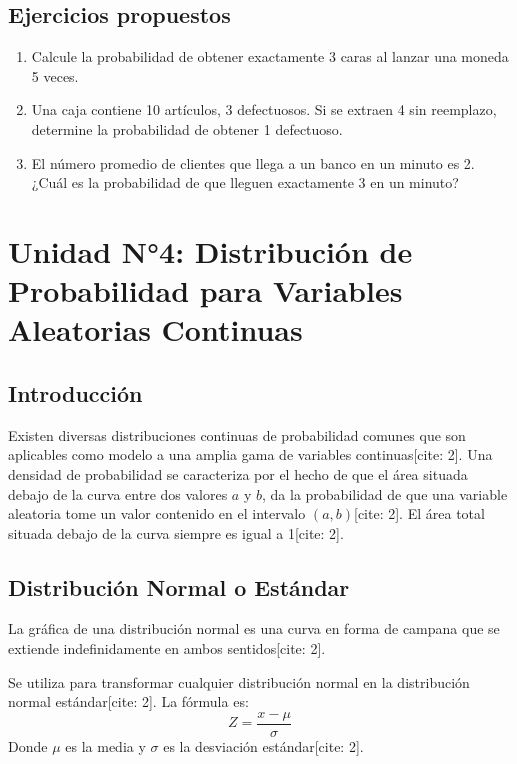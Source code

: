 \documentclass[12pt,a4paper]{book}
\begin{document}
\section{Ejercicios propuestos}
\begin{enumerate}
    \item Calcule la probabilidad de obtener exactamente 3 caras al lanzar una moneda 5 veces.
    \item Una caja contiene 10 artículos, 3 defectuosos. Si se extraen 4 sin reemplazo, determine la probabilidad de obtener 1 defectuoso.
    \item El número promedio de clientes que llega a un banco en un minuto es 2. ¿Cuál es la probabilidad de que lleguen exactamente 3 en un minuto?
\end{enumerate}


\chapter{Unidad N°4: Distribución de Probabilidad para Variables Aleatorias Continuas}

\section{Introducción}
Existen diversas distribuciones continuas de probabilidad comunes que son aplicables como modelo a una amplia gama de variables continuas[cite: 2]. Una densidad de probabilidad se caracteriza por el hecho de que el área situada debajo de la curva entre dos valores $a$ y $b$, da la probabilidad de que una variable aleatoria tome un valor contenido en el intervalo $(a,b)$[cite: 2]. El área total situada debajo de la curva siempre es igual a 1[cite: 2].

\section{Distribución Normal o Estándar}
La gráfica de una distribución normal es una curva en forma de campana que se extiende indefinidamente en ambos sentidos[cite: 2]. 

\begin{definicion}[Estandarización]
Se utiliza para transformar cualquier distribución normal en la distribución normal estándar[cite: 2]. La fórmula es:
\[
Z = \frac{x - \mu}{\sigma}
\]
Donde $\mu$ es la media y $\sigma$ es la desviación estándar[cite: 2].
\end{definicion}
\end{document}
